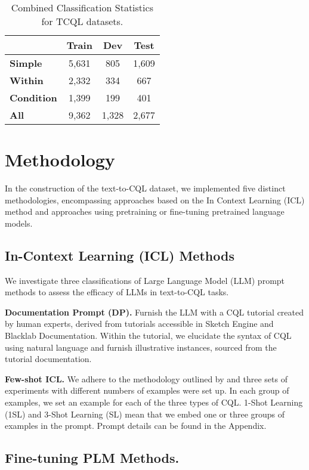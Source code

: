 \documentclass[11pt]{article}
\begin{document}
\begin{CJK*}{UTF8}{gbsn}
\begin{table}[h!]
\centering
\begin{tabular}{lccc}
\toprule
 & \textbf{Train} & \textbf{Dev} & \textbf{Test} \\
\midrule
\textbf{Simple} & 5,631 & 805 & 1,609 \\
\textbf{Within} & 2,332 & 334 & 667 \\
\textbf{Condition} & 1,399 & 199 & 401 \\
\textbf{All} & 9,362 & 1,328 & 2,677 \\
\bottomrule
\end{tabular}
\caption{Combined Classification Statistics for TCQL datasets.}
\label{tab:combined_statistics}
\end{table}

\section{Methodology}
In the construction of the text-to-CQL dataset, we implemented five distinct methodologies, encompassing approaches based on the In Context Learning (ICL) method and approaches using pretraining or fine-tuning pretrained language models.

\subsection{In-Context Learning (ICL) Methods}

We investigate three classifications of Large Language Model (LLM) prompt methods to assess the efficacy of LLMs in text-to-CQL tasks.

\textbf{Documentation Prompt (DP).} Furnish the LLM with a CQL tutorial created by human experts, derived from tutorials accessible in Sketch Engine\citep{sketchengine1,sketchengine2} and Blacklab\citep{blacklab} Documentation. Within the tutorial, we elucidate the syntax of CQL using natural language and furnish illustrative instances, sourced from the tutorial documentation.

\textbf{Few-shot ICL.} We adhere to the methodology outlined by \citet{sun2023battle} and three sets of experiments with different numbers of examples were set up. In each group of examples, we set an example for each of the three types of CQL. 1-Shot Learning (1SL) and 3-Shot Learning (SL) mean that we embed one or three groups of examples in the prompt. Prompt details can be found in the Appendix.

\subsection{Fine-tuning PLM Methods. }  


\end{CJK*}
\end{document}
